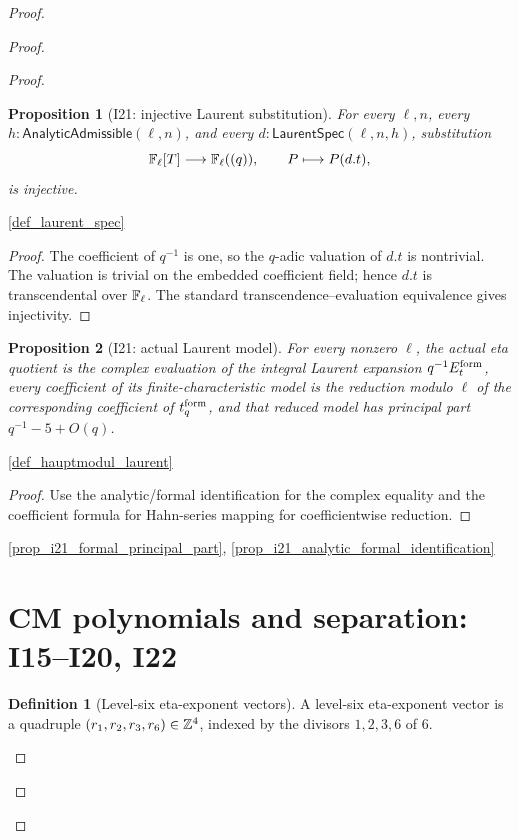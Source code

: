 \documentclass[11pt,a4paper]{article}
\numberwithin{equation}{section}
\theoremstyle{plain}\newtheorem{theorem}{Theorem}[section]\newaliascnt{proposition}{theorem}\newtheorem{proposition}[proposition]{Proposition}\aliascntresetthe{proposition}\newaliascnt{lemma}{theorem}\newtheorem{lemma}[lemma]{Lemma}\aliascntresetthe{lemma}
\theoremstyle{definition}\newaliascnt{definition}{theorem}\newtheorem{definition}[definition]{Definition}\aliascntresetthe{definition}\newaliascnt{notation}{theorem}\newtheorem{notation}[notation]{Notation}\aliascntresetthe{notation}
\providecommand{\lean}[1]{}\providecommand{\leanok}{}
\begin{document}
\begin{proof}
\begin{proof}
\begin{proof}
\begin{proposition}[I21: injective Laurent substitution]\label{prop_i21_laurent_hauptmodul}\lean{SptCM.Repair.LaurentHauptmodulData.substitution_injective}\leanok
For every $\ell,n$, every $h:\mathsf{AnalyticAdmissible}(\ell,n)$, and every
$d:\mathsf{LaurentSpec}(\ell,n,h)$, substitution
\[
  \mathbb F_\ell[T]\longrightarrow\mathbb F_\ell((q)),\qquad P\longmapsto P(d.t),
\]
is injective.
\end{proposition}
\begin{uses-statement}\ref{def_laurent_spec}\end{uses-statement}
\begin{proof}
The coefficient of $q^{-1}$ is one, so the $q$-adic valuation of $d.t$ is
nontrivial.  The valuation is trivial on the embedded coefficient field;
hence $d.t$ is transcendental over $\mathbb F_\ell$.  The standard
transcendence--evaluation equivalence gives injectivity.
\end{proof}

\begin{proposition}[I21: actual Laurent model]\label{prop_i21_actual_laurent_model}\lean{SptCM.Repair.actualHauptmodulLaurent_analytic_identification}\leanok
For every nonzero $\ell$, the actual eta quotient is the complex evaluation
of the integral Laurent expansion \(q^{-1}E_t^{\rm form}\), every coefficient
of its finite-characteristic model is the reduction modulo $\ell$ of the
corresponding coefficient of \(t_q^{\rm form}\), and that reduced model has
principal part \(q^{-1}-5+O(q)\).
\end{proposition}
\begin{uses-statement}\ref{def_hauptmodul_laurent}\end{uses-statement}
\begin{proof}
Use the analytic/formal identification for the complex equality and the
coefficient formula for Hahn-series mapping for coefficientwise reduction.
\end{proof}
\begin{uses-proof}\ref{prop_i21_formal_principal_part}, \ref{prop_i21_analytic_formal_identification}\end{uses-proof}

\section{CM polynomials and separation: I15--I20, I22}
\begin{definition}[Level-six eta-exponent vectors]\label{def_level_six_eta_exponents}\lean{SptCM.CM.Repaired.LevelSixEtaExponents}\leanok
A level-six eta-exponent vector is a quadruple $(r_1,r_2,r_3,r_6)\in\mathbb Z^4$, indexed by the divisors $1,2,3,6$ of $6$.
\end{definition}


\end{proof}
\end{proof}
\end{proof}
\end{document}
